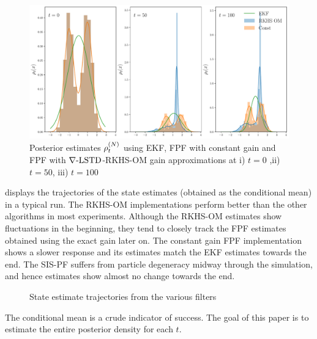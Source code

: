 \begin{figure}[htbp]
	\includegraphics[width = 6in] {images/Chap4_Posterior_estimate}
	\caption{ Posterior estimates $\rho_t^{(N)}$ using EKF, FPF with constant gain and FPF with $\nabla\text{-LSTD}$-RKHS-OM gain approximations at i) $t=0$ ,ii) $t = 50$, iii) $t = 100$}
	\label{fig:gain_hist_028}
\end{figure}



 displays the trajectories of the state estimates (obtained as the conditional mean) in a typical run.  The RKHS-OM implementations perform better than the other algorithms in most experiments. Although the RKHS-OM estimates show fluctuations in the beginning, they tend to closely track the FPF estimates obtained using the exact gain later on. The constant gain FPF implementation shows a slower response and its estimates match the EKF estimates towards the end. The SIS-PF suffers from particle degeneracy midway through the simulation, and hence estimates show almost no change towards the end.

\begin{figure}[htbp]
	\centering
	\caption{ State estimate trajectories from the various filters}
	\label{steady_state_estimate}
\end{figure}

The conditional mean is a crude indicator of success. The goal of this paper is to estimate the entire posterior density for each $t$.

